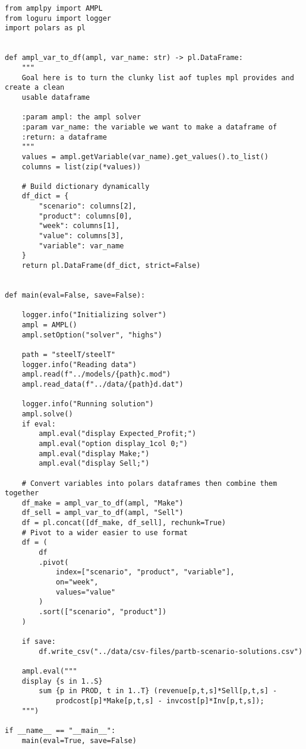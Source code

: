 \begin{verbatim}
from amplpy import AMPL
from loguru import logger
import polars as pl


def ampl_var_to_df(ampl, var_name: str) -> pl.DataFrame:
    """
    Goal here is to turn the clunky list aof tuples mpl provides and create a clean
    usable dataframe

    :param ampl: the ampl solver
    :param var_name: the variable we want to make a dataframe of
    :return: a dataframe
    """
    values = ampl.getVariable(var_name).get_values().to_list()
    columns = list(zip(*values))

    # Build dictionary dynamically
    df_dict = {
        "scenario": columns[2],
        "product": columns[0],
        "week": columns[1],
        "value": columns[3],
        "variable": var_name
    }
    return pl.DataFrame(df_dict, strict=False)


def main(eval=False, save=False):

    logger.info("Initializing solver")
    ampl = AMPL()
    ampl.setOption("solver", "highs")

    path = "steelT/steelT"
    logger.info("Reading data")
    ampl.read(f"../models/{path}c.mod")
    ampl.read_data(f"../data/{path}d.dat")

    logger.info("Running solution")
    ampl.solve()
    if eval:
        ampl.eval("display Expected_Profit;")
        ampl.eval("option display_1col 0;")
        ampl.eval("display Make;")
        ampl.eval("display Sell;")

    # Convert variables into polars dataframes then combine them together
    df_make = ampl_var_to_df(ampl, "Make")
    df_sell = ampl_var_to_df(ampl, "Sell")
    df = pl.concat([df_make, df_sell], rechunk=True)
    # Pivot to a wider easier to use format
    df = (
        df
        .pivot(
            index=["scenario", "product", "variable"],
            on="week",
            values="value"
        )
        .sort(["scenario", "product"])
    )

    if save:
        df.write_csv("../data/csv-files/partb-scenario-solutions.csv")

    ampl.eval("""
    display {s in 1..S}
        sum {p in PROD, t in 1..T} (revenue[p,t,s]*Sell[p,t,s] -
            prodcost[p]*Make[p,t,s] - invcost[p]*Inv[p,t,s]);
    """)

if __name__ == "__main__":
    main(eval=True, save=False)
\end{verbatim}